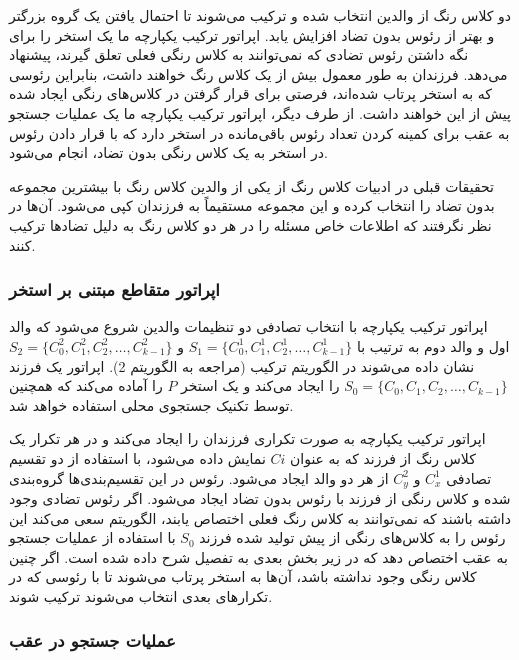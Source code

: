 \documentclass[a4paper,10pt]{article}
\begin{document}
            دو کلاس رنگ از والدین انتخاب شده و ترکیب می‌شوند تا احتمال یافتن یک گروه بزرگتر و بهتر از رئوس بدون تضاد افزایش یابد. اپراتور ترکیب یکپارچه ما یک استخر را برای نگه داشتن رئوس تضادی که نمی‌توانند به کلاس رنگی فعلی تعلق گیرند، پیشنهاد می‌دهد. فرزندان به طور معمول بیش از یک کلاس رنگ خواهند داشت، بنابراین رئوسی که به استخر پرتاب شده‌اند، فرصتی برای قرار گرفتن در کلاس‌های رنگی ایجاد شده پیش از این خواهند داشت. از طرف دیگر، اپراتور ترکیب یکپارچه ما یک عملیات جستجو به عقب برای کمینه کردن تعداد رئوس باقی‌مانده در استخر دارد که با قرار دادن رئوس در استخر به یک کلاس رنگی بدون تضاد، انجام می‌شود.

            تحقیقات قبلی در ادبیات کلاس رنگ از یکی از والدین کلاس رنگ با بیشترین مجموعه بدون تضاد را انتخاب کرده و این مجموعه مستقیماً به فرزندان کپی می‌شود. آن‌ها در نظر نگرفتند که اطلاعات خاص مسئله را در هر دو کلاس رنگ به دلیل تضادها ترکیب کنند.

            \subsubsection{اپراتور متقاطع مبتنی بر استخر}

                اپراتور ترکیب یکپارچه با انتخاب تصادفی دو تنظیمات والدین شروع می‌شود که والد اول و والد دوم به ترتیب با
                $S_1 = \{C_{0}^{1}, C_{1}^{1}, C_{2}^{1}, \dots, C_{k-1}^{1}\}$
                و
                $S_2 = \{C_{0}^{2}, C_{1}^{2}, C_{2}^{2}, \dots, C_{k-1}^{2}\}$
                نشان داده می‌شوند در الگوریتم ترکیب (مراجعه به الگوریتم 2). اپراتور یک فرزند
                $S_0 = \{C_0, C_1, C_2, \dots, C_{k-1}\}$
                را ایجاد می‌کند و یک استخر $P$ را آماده می‌کند که همچنین توسط تکنیک جستجوی محلی استفاده خواهد شد.

                اپراتور ترکیب یکپارچه به صورت تکراری فرزندان را ایجاد می‌کند و در هر تکرار یک کلاس رنگ از فرزند که به عنوان $Ci$ نمایش داده می‌شود، با استفاده از دو تقسیم تصادفی $C_{x}^{1}$ و $C_{y}^{2}$ از هر دو والد ایجاد می‌شود. رئوس در این تقسیم‌بندی‌ها گروه‌بندی شده و کلاس رنگی از فرزند با رئوس بدون تضاد ایجاد می‌شود. اگر رئوس تضادی وجود داشته باشند که نمی‌توانند به کلاس رنگ فعلی اختصاص یابند، الگوریتم سعی می‌کند این رئوس را به کلاس‌های رنگی از پیش تولید شده فرزند $S_0$ با استفاده از عملیات جستجو به عقب اختصاص دهد که در زیر بخش بعدی به تفصیل شرح داده شده است. اگر چنین کلاس رنگی وجود نداشته باشد، آن‌ها به استخر پرتاب می‌شوند تا با رئوسی که در تکرارهای بعدی انتخاب می‌شوند ترکیب شوند.
            
            \subsubsection{عملیات جستجو در عقب}
\end{document}
